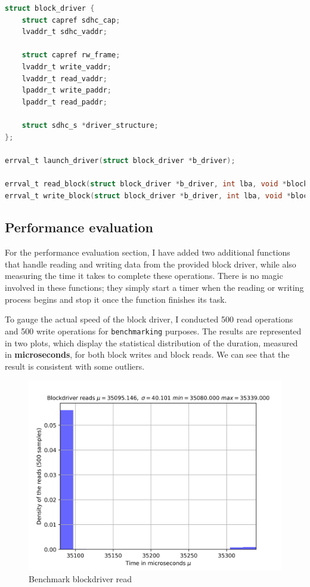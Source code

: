 \begin{lstlisting}[caption={Wrapper around the block driver},captionpos=b,language=C,frame=single,breaklines]
struct block_driver {
    struct capref sdhc_cap;
    lvaddr_t sdhc_vaddr;

    struct capref rw_frame;
    lvaddr_t write_vaddr;
    lvaddr_t read_vaddr;
    lpaddr_t write_paddr;
    lpaddr_t read_paddr;

    struct sdhc_s *driver_structure;
};

errval_t launch_driver(struct block_driver *b_driver);

errval_t read_block(struct block_driver *b_driver, int lba, void *block);
errval_t write_block(struct block_driver *b_driver, int lba, void *block);

\end{lstlisting}

\subsection{Performance evaluation}

For the performance evaluation section, I have added two additional functions that handle reading and writing data from the provided block driver, while also measuring the time it takes to complete these operations. There is no magic involved in these functions; they simply start a timer when the reading or writing process begins and stop it once the function finishes its task.

To gauge the actual speed of the block driver, I conducted 500 read operations and 500 write operations for \texttt{benchmarking} purposes. The results are represented in two plots, which display the statistical distribution of the duration, measured in \textbf{microseconds}, for both block writes and block reads. We can see that the result is consistent with some outliers.

\begin{figure}[htp]
    \centering
    \includegraphics[width=12cm]{images/filesystem/benchmark_read.jpg}
    \caption{Benchmark blockdriver read}
    \label{fig:galaxy}
\end{figure}


